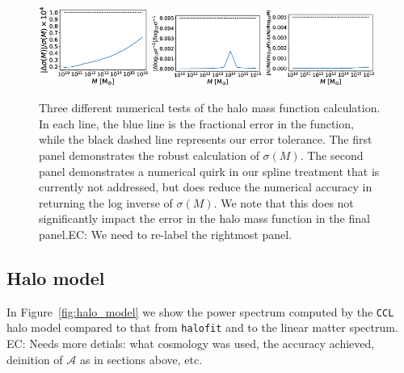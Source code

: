 \documentclass[\docopts]{\docclass}
\newcommand{\elisa}[1]{\textcolor{green!10!orange!90!}{EC: #1}}
\newcommand{\ccl}{{\tt CCL}\xspace}
\newcommand{\halofit}{{\tt halofit}\xspace}
\begin{document}
\begin{figure}
\includegraphics[width=0.32\textwidth]{hmf_model1}
\includegraphics[width=0.32\textwidth]{hmf_model1_b}
\includegraphics[width=0.32\textwidth]{hmf_model1_c}
\caption{Three different numerical tests of the halo mass function calculation. In each line, the blue line is the fractional error in the function, while the black dashed line represents our error tolerance. The first panel demonstrates the robust calculation of $\sigma(M)$. The second panel demonstrates a numerical quirk in our spline treatment that is currently not addressed, but does reduce the numerical accuracy in returning the log inverse of $\sigma(M)$. We note that this does not significantly impact the error in the halo mass function in the final panel.\elisa{We need to re-label the rightmost panel.}}
\label{fig:hmf}
\end{figure}

\subsection{Halo model}
\label{sec:halo_model_verification}

In Figure~\ref{fig:halo_model} we show the power spectrum computed by the \ccl halo model compared to that from \halofit and to the linear matter spectrum. \elisa{Needs more detials: what cosmology was used, the accuracy achieved, deinition of $\mathcal{A}$ as in sections above, etc.}
\end{document}
